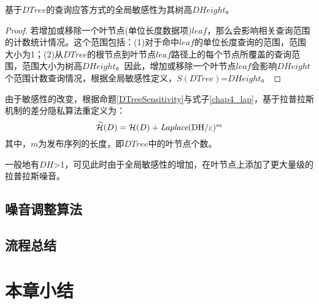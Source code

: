 \begin{prop}
	\label{DTreeSensitivity}
	基于$DTree$的查询应答方式的全局敏感性为其树高$DHeight$。
\end{prop}
\begin{proof}
	若增加或移除一个叶节点(单位长度数据项)$leaf$，那么会影响相关查询范围的计数统计情况。这个范围包括：(1)对于命中$leaf$的单位长度查询的范围，范围大小为1；(2)从$DTree$的根节点到叶节点$leaf$路径上的每个节点所覆盖的查询范围，范围大小为树高$DHeight$。因此，增加或移除一个叶节点$leaf$会影响$DHeight$个范围计数查询情况，根据全局敏感性定义，$S(DTree)$=$DHeight$。
\end{proof}

由于敏感性的改变，根据命题\ref{DTreeSensitivity}与式子\ref{chap4_lap}，基于拉普拉斯机制的差分隐私算法重定义为：
\begin{equation}
\label{chap4_dtree}
\widetilde{\mathcal{H}}(D) = \mathcal{H}(D) + \textit{Laplace}($DH$/\varepsilon)^m
\end{equation}
其中，$m$为发布序列的长度，即$DTree$中的叶节点个数。

一般地有$DH$>1，可见此时由于全局敏感性的增加，在叶节点上添加了更大量级的拉普拉斯噪音。



\subsection{噪音调整算法}


\subsection{流程总结}

\section{本章小结}